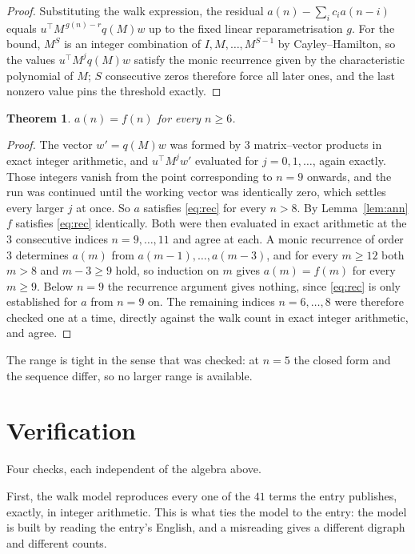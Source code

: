 \documentclass[11pt,a4paper]{article}
\theoremstyle{plain}
\newtheorem{theorem}{Theorem}
\theoremstyle{definition}
\begin{document}
\begin{proof}
Substituting the walk expression, the residual $a(n)-\sum_ic_ia(n-i)$ equals
$u^{\!\top}M^{\,g(n)-r}q(M)w$ up to the fixed linear reparametrisation $g$. For the bound,
$M^{S}$ is an integer combination of $I,M,\dots,M^{S-1}$ by Cayley--Hamilton, so the values
$u^{\!\top}M^{j}q(M)w$ satisfy the monic recurrence given by the characteristic polynomial of
$M$; $S$ consecutive zeros therefore force all later ones, and the last nonzero value pins the
threshold exactly.
\end{proof}

\begin{theorem}
$a(n)=f(n)$ for every $n\ge6$.
\end{theorem}

\begin{proof}
The vector $w'=q(M)w$ was formed by $3$ matrix--vector products in exact integer
arithmetic, and $u^{\!\top}M^{j}w'$ evaluated for $j=0,1,\dots$, again exactly. Those integers
vanish from the point corresponding to $n=9$ onwards, and the run was continued until the
working vector was identically zero, which settles every larger $j$ at once. So $a$ satisfies
\eqref{eq:rec} for every $n>8$. By Lemma~\ref{lem:ann} $f$ satisfies \eqref{eq:rec}
identically. Both were then evaluated in exact arithmetic at the $3$ consecutive indices
$n=9,\dots,11$ and agree at each. A monic recurrence of order $3$
determines $a(m)$ from $a(m-1),\dots,a(m-3)$, and for every $m\ge12$ both
$m>8$ and $m-3\ge9$ hold, so induction on $m$ gives $a(m)=f(m)$ for every
$m\ge9$.
Below $n=9$ the recurrence argument gives nothing, since \eqref{eq:rec} is only
established for $a$ from $n=9$ on. The remaining indices $n=6,\dots,8$ were
therefore checked one at a time, directly against the walk count in exact integer arithmetic,
and agree.
\end{proof}

The range is tight in the sense that was checked: at $n=5$ the closed form and the sequence differ, so no larger range is available.

\section{Verification}

Four checks, each independent of the algebra above.

First, the walk model reproduces every one of the $41$ terms the entry publishes,
exactly, in integer arithmetic. This is what ties the model to the entry: the model is built
by reading the entry's English, and a misreading gives a different digraph and different
counts.
\end{document}
